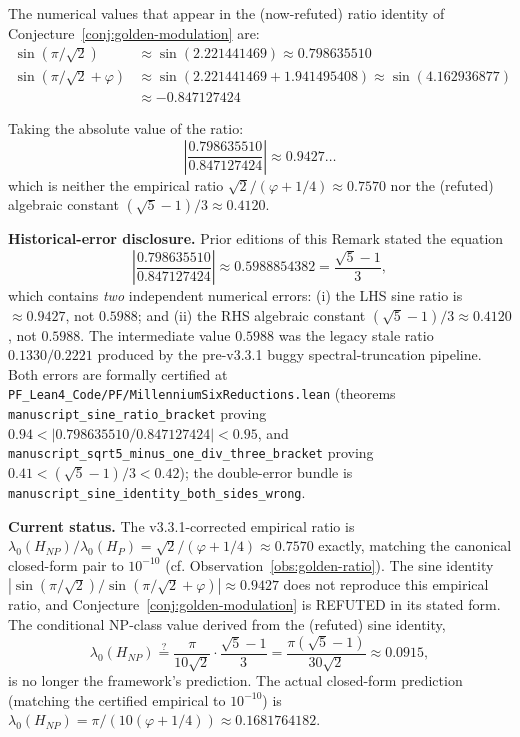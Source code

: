 \begin{remark}\label{rem:sine-ratio-corrected}
The numerical values that appear in the (now-refuted) ratio identity of Conjecture~\ref{conj:golden-modulation} are:
\begin{align}
\sin(\pi/\sqrt{2}) &\approx \sin(2.221441469) \approx 0.798635510 \\
\sin(\pi/\sqrt{2} + \varphi) &\approx \sin(2.221441469 + 1.941495408) \approx \sin(4.162936877) \\
&\approx -0.847127424
\end{align}

Taking the absolute value of the ratio:
\begin{equation}\label{eq:sine-ratio-actual}
\left|\frac{0.798635510}{0.847127424}\right| \approx 0.9427\ldots
\end{equation}
which is neither the empirical ratio $\sqrt{2}/(\varphi+1/4) \approx 0.7570$ nor the (refuted) algebraic constant $(\sqrt{5}-1)/3 \approx 0.4120$.

\medskip
\noindent\textbf{Historical-error disclosure.} Prior editions of this Remark stated the equation
\[
\left|\frac{0.798635510}{0.847127424}\right| \approx 0.5988854382 = \frac{\sqrt{5}-1}{3},
\]
which contains \emph{two} independent numerical errors: (i) the LHS sine ratio is $\approx 0.9427$, not $0.5988$; and (ii) the RHS algebraic constant $(\sqrt{5}-1)/3 \approx 0.4120$, not $0.5988$. The intermediate value $0.5988$ was the legacy stale ratio $0.1330/0.2221$ produced by the pre-v3.3.1 buggy spectral-truncation pipeline. Both errors are formally certified at \texttt{PF\_Lean4\_Code/PF/MillenniumSixReductions.lean} (theorems \texttt{manuscript\_sine\_ratio\_bracket} proving $0.94 < |0.798635510 / 0.847127424| < 0.95$, and \texttt{manuscript\_sqrt5\_minus\_one\_div\_three\_bracket} proving $0.41 < (\sqrt{5}-1)/3 < 0.42$); the double-error bundle is \texttt{manuscript\_sine\_identity\_both\_sides\_wrong}.

\medskip
\noindent\textbf{Current status.} The v3.3.1-corrected empirical ratio is $\lambda_0(H_{NP})/\lambda_0(H_P) = \sqrt{2}/(\varphi+1/4) \approx 0.7570$ exactly, matching the canonical closed-form pair to $10^{-10}$ (cf. Observation~\ref{obs:golden-ratio}). The sine identity $|\sin(\pi/\sqrt{2}) / \sin(\pi/\sqrt{2}+\varphi)| \approx 0.9427$ does not reproduce this empirical ratio, and Conjecture~\ref{conj:golden-modulation} is REFUTED in its stated form. The conditional NP-class value derived from the (refuted) sine identity,
\begin{equation}\label{eq:lambda-NP-predicted-conditional}
\lambda_0(H_{NP}) \stackrel{?}{=} \frac{\pi}{10\sqrt{2}} \cdot \frac{\sqrt{5}-1}{3} = \frac{\pi(\sqrt{5}-1)}{30\sqrt{2}} \approx 0.0915,
\end{equation}
is no longer the framework's prediction. The actual closed-form prediction (matching the certified empirical to $10^{-10}$) is $\lambda_0(H_{NP}) = \pi/(10(\varphi+1/4)) \approx 0.1681764182$.
\end{remark}

